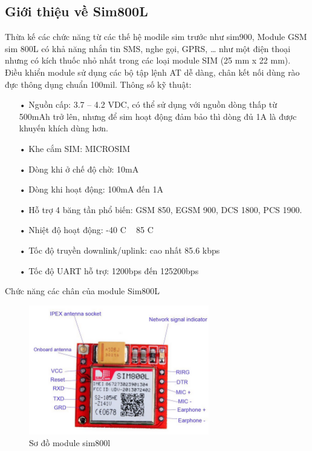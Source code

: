 \subsection*{Giới thiệu về Sim800L}
Thừa kế các chức năng từ các thế hệ modile sim trước như sim900, Module GSM sim 800L có khả năng nhắn tin SMS, nghe gọi, GPRS, … như một điện thoại nhưng có kích thuốc nhỏ nhất trong các loại module SIM (25 mm x 22 mm). Điều khiển module sử dụng các bộ tập lệnh AT dễ dàng, chân kết nối dùng rào đực thông dụng chuẩn 100mil.
Thông số kỹ thuật:
\begin{itemize}

\item[•]Nguồn cấp: 3.7 – 4.2 VDC, có thể sử dụng với nguồn dòng thấp từ 500mAh trở lên, nhưng để sim hoạt động đảm bảo thì dòng đủ 1A là được khuyến khích dùng hơn.
\item[•]Khe cắm SIM: MICROSIM
\item[•]Dòng khi ở chế độ chờ: 10mA
\item[•]Dòng khi hoạt động: 100mA đến 1A
\item[•]Hỗ trợ 4 băng tần phổ biến: GSM 850, EGSM 900, DCS 1800, PCS 1900.
\item[•]Nhiệt độ hoạt động: -40 C ~ 85 C
\item[•]Tốc độ truyền downlink/uplink: cao nhất 85.6 kbps
\item[•]Tốc độ UART hỗ trợ: 1200bps đến 125200bps
\end{itemize}

Chức năng các chân của module Sim800L
\begin{center}
\begin{figure}[htp]
\centering    
\includegraphics[width=0.7\textwidth]{sim800l}
\caption[Sơ đồ module sim800l]{Sơ đồ module sim800l}
\label{fig:sim800l}
\end{figure}
\end{center}	

